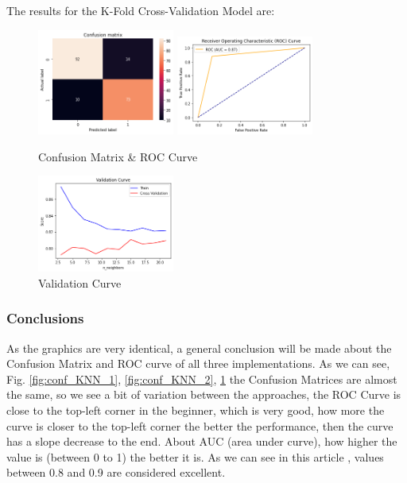 \documentclass[conference]{IEEEtran}
\begin{document}
The results for the K-Fold Cross-Validation Model are:

\begin{figure}[h!]
    \includegraphics[width=4.5cm]{k-NN/k3_1.png}%
    \includegraphics[width=4.5cm]{k-NN/k3_2.png}%
    \caption{Confusion Matrix & ROC Curve}%
    \label{fig:conf_KNN_3}%
\end{figure}

\begin{figure}[h!]
    \centering
    \includegraphics[width=4.5cm]{k-NN/k4.png}
    \caption{Validation Curve}
    \label{img:validationCurveKNN}
\end{figure}

\subsubsection{Conclusions}
As the graphics are very identical, a general conclusion will be made about the Confusion Matrix and ROC curve of all three implementations. As we can see, Fig. \ref{fig:conf_KNN_1}, \ref{fig:conf_KNN_2}, \ref{fig:conf_KNN_3} the Confusion Matrices are almost the same, so we see a bit of variation between the approaches, the ROC Curve is close to the top-left corner in the beginner, which is very good, how more the curve is closer to the top-left corner the better the performance, then the curve has a slope decrease to the end. About AUC (area under curve), how higher the value is (between 0 to 1) the better it is. As we can see in this article \cite{ROC_article}, values between 0.8 and 0.9 are considered excellent.
\end{document}
